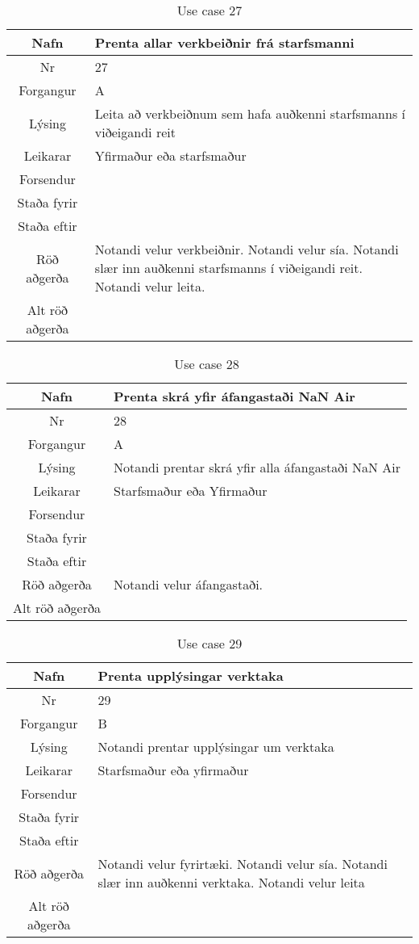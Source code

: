 \begin{table}[h!]\centering
\begin{tabular}{|c|p{10cm}|}
\hline
Nafn&Prenta allar verkbeiðnir frá starfsmanni\\
\hline
Nr&27\\
\hline
Forgangur&A\\
\hline
Lýsing&Leita að verkbeiðnum sem hafa auðkenni starfsmanns í viðeigandi reit\\
\hline
Leikarar&Yfirmaður eða starfsmaður\\
\hline
Forsendur&\\
\hline
Staða fyrir&\\
\hline
Staða eftir&\\
\hline
Röð aðgerða&Notandi velur verkbeiðnir. Notandi velur sía. Notandi slær inn auðkenni starfsmanns í viðeigandi reit. Notandi velur leita.\\
\hline
Alt röð aðgerða&\\
\hline
\end{tabular}
\caption{Use case 27}\label{tab:use_case_27}
\end{table}
\begin{table}[h!]\centering
\begin{tabular}{|c|p{10cm}|}
\hline
Nafn&Prenta skrá yfir áfangastaði NaN Air\\
\hline
Nr&28\\
\hline
Forgangur&A\\
\hline
Lýsing&Notandi prentar skrá yfir alla áfangastaði NaN Air\\
\hline
Leikarar&Starfsmaður eða Yfirmaður\\
\hline
Forsendur&\\
\hline
Staða fyrir&\\
\hline
Staða eftir&\\
\hline
Röð aðgerða&Notandi velur áfangastaði.\\
\hline
Alt röð aðgerða&\\
\hline
\end{tabular}
\caption{Use case 28}\label{tab:use_case_28}
\end{table}
\begin{table}[h!]\centering
\begin{tabular}{|c|p{10cm}|}
\hline
Nafn&Prenta upplýsingar verktaka\\
\hline
Nr&29\\
\hline
Forgangur&B\\
\hline
Lýsing&Notandi prentar upplýsingar um verktaka\\
\hline
Leikarar&Starfsmaður eða yfirmaður\\
\hline
Forsendur&\\
\hline
Staða fyrir&\\
\hline
Staða eftir&\\
\hline
Röð aðgerða&Notandi velur fyrirtæki. Notandi velur sía. Notandi slær inn auðkenni verktaka. Notandi velur leita\\
\hline
Alt röð aðgerða&\\
\hline
\end{tabular}
\caption{Use case 29}\label{tab:use_case_29}
\end{table}
